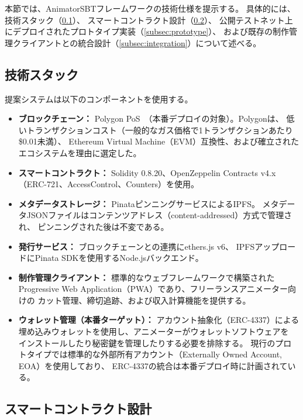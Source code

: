 
本節では、AnimatorSBTフレームワークの技術仕様を提示する。
具体的には、技術スタック（\cref{subsec:stack}）、
スマートコントラクト設計（\cref{subsec:contract}）、
公開テストネット上にデプロイされたプロトタイプ実装（\cref{subsec:prototype}）、
および既存の制作管理クライアントとの統合設計（\cref{subsec:integration}）について述べる。

\subsection{技術スタック}
\label{subsec:stack}

提案システムは以下のコンポーネントを使用する。

\begin{itemize}
  \item \textbf{ブロックチェーン：} Polygon PoS~\cite{gangwal2023layer2}（本番デプロイの対象）。Polygonは、
    低いトランザクションコスト（一般的なガス価格で1トランザクションあたり\$0.01未満）、
    Ethereum Virtual Machine（EVM）互換性、および確立されたエコシステムを理由に選定した。
  \item \textbf{スマートコントラクト：} Solidity 0.8.20、OpenZeppelin Contracts v4.x
    （ERC-721、AccessControl、Counters）を使用。
  \item \textbf{メタデータストレージ：} PinataピンニングサービスによるIPFS。
    メタデータJSONファイルはコンテンツアドレス（content-addressed）方式で管理され、
    ピンニングされた後は不変である。
  \item \textbf{発行サービス：} ブロックチェーンとの連携にethers.js v6、
    IPFSアップロードにPinata SDKを使用するNode.jsバックエンド。
  \item \textbf{制作管理クライアント：} 標準的なウェブフレームワークで構築された
    Progressive Web Application（PWA）であり、フリーランスアニメーター向けの
    カット管理、締切追跡、および収入計算機能を提供する。
  \item \textbf{ウォレット管理（本番ターゲット）：} アカウント抽象化（ERC-4337）による
    埋め込みウォレットを使用し、アニメーターがウォレットソフトウェアを
    インストールしたり秘密鍵を管理したりする必要を排除する。
    現行のプロトタイプでは標準的な外部所有アカウント（Externally Owned Account, EOA）を使用しており、
    ERC-4337の統合は本番デプロイ時に計画されている。
\end{itemize}

\subsection{スマートコントラクト設計}
\label{subsec:contract}

